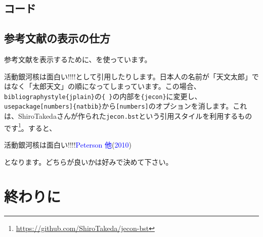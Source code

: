 \documentclass[a4paper,papersize,uplatex,dvipdfmx,10pt]{jsarticle}
\newcommand{\bs}{\symbol{92}} %
\newcommand{\blue}[1]{\textcolor{blue}{#1}} %
\begin{document}
\subsection{コード} %

\subsection{参考文献の表示の仕方}
参考文献を表示するために、\BibTeX を使っています。\par
活動銀河核は面白い!!!!\cite{1130000796831041920}として引用したりします。日本人の名前が「天文太郎」ではなく「太郎天文」の順になってしまっています。この場合、\texttt{\bs bibliographystyle\{jplain\}}の\texttt{\{ \}}の内部を\texttt{\{jecon\}}に変更し、\texttt{\bs usepackage[numbers]\{natbib\}}から\texttt{[numbers]}のオプションを消します。これは、ShiroTakedaさんが作られた\texttt{jecon.bst}という引用スタイルを利用するものです\footnote{\url{https://github.com/ShiroTakeda/jecon-bst}}。すると、
\begin{screen}
  活動銀河核は面白い!!!!\blue{Peterson 他}(\blue{2010})
\end{screen}
となります。どちらが良いかは好みで決めて下さい。

\section{終わりに} %

\renewcommand{\bibname}{参考文献}
%


\end{document}
